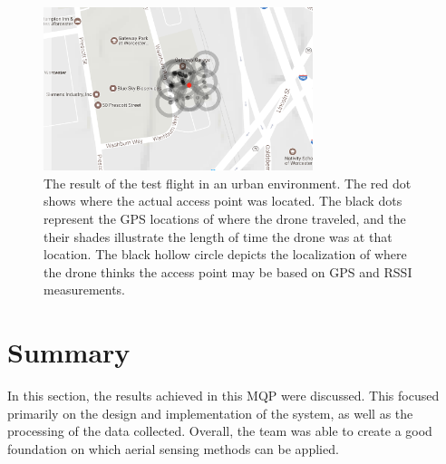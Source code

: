\begin{figure}[ht!]
    \centering
    \includegraphics[width=0.70\textwidth]{img/urban_test_map.png}
    \caption{The result of the test flight in an urban environment. The red dot shows where the actual access point was located. The black dots represent the GPS locations of where the drone traveled, and the their shades illustrate the length of time the drone was at that location. The black hollow circle depicts the localization of where the drone thinks the access point may be based on GPS and RSSI measurements.}
    \label{fig:urban_test}
\end{figure} \par



\section{Summary}
In this section, the results achieved in this MQP were discussed. This focused primarily on the design and implementation of the system, as well as the processing of the data collected. Overall, the team was able to create a good foundation on which aerial sensing methods can be applied.
